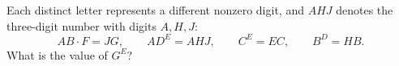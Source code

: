 Each distinct letter represents a different nonzero digit, and $AHJ$ denotes the three-digit number with digits $A,H,J$:
\[AB\cdot F=JG,\qquad AD^E=AHJ,\qquad C^E=EC,\qquad B^D=HB.\]
What is the value of $G^E$?
